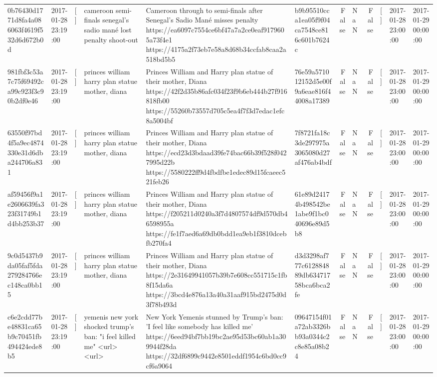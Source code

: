 \begin{tabular}{llllllrlrlll}
0b76430d1771d8fa4a086063f4619f532d6d672b0d & 2017-01-28 23:19:00 & [] & cameroon semi-finals senegal's sadio mané lost penalty shoot-out & Cameroon through to semi-finals after Senegal’s Sadio Mané misses penalty https://ea6097c7554ce6bf47a7a2ce0eaf9179605a73f4e1 https://4175a2f73eb7e58a8d68b34ccfab8caa2a518bd5b5 & b9b95510cca1ea05f9f04ca7548ce816c601b7624c & False & NaN & False & [] & 2017-01-28 23:00:00 & 2017-01-29 00:00:00 \\
981fbf3c53a7c75f69492ca99c923f3c90b2df0e46 & 2017-01-28 23:19:00 & [] & princes william harry plan statue mother, diana & Princes William and Harry plan statue of their mother, Diana https://42f2d35b86afc034f23f9b6eb444b27f916818fb00 https://55260b73557d705c5ea4f7f3d7edac1efc8a5004bf & 76e59a571012152d5e00f9a6eae816f44008a17389 & False & NaN & False & [] & 2017-01-28 23:00:00 & 2017-01-29 00:00:00 \\
63550f97bd4f5a9ec4874330e31d6dba244706a831 & 2017-01-28 23:19:00 & [] & princes william harry plan statue mother, diana & Princes William and Harry plan statue of their mother, Diana https://ecd23d3bdaad39fe74bac66b39f528f0427995d22b https://5580222ff9d4fbdfbe1edec89d15fcaeec521feb26 & 7f8721fa18c3de297975a3065080d27af476ab4bdf & False & NaN & False & [] & 2017-01-28 23:00:00 & 2017-01-29 00:00:00 \\
af59456f9a1e2606639fa323f31749b1d4bb253b37 & 2017-01-28 23:19:00 & [] & princes william harry plan statue mother, diana & Princes William and Harry plan statue of their mother, Diana https://f205211d0240a3f7d4807574df9d570db46598955a https://fe1f7aed6a69db0bdd1ea9eb1f3810dcebfb270fa4 & 61e89d24174b498542be1abe9f1bc040696e89d5b8 & False & NaN & False & [] & 2017-01-28 23:00:00 & 2017-01-29 00:00:00 \\
9c0d5437b9da05faf5fda279284766ec148ca0bb15 & 2017-01-28 23:19:00 & [] & princes william harry plan statue mother, diana & Princes William and Harry plan statue of their mother, Diana https://2e31649941057b39b7e608cc551715c1fb8f15da6a https://3bcd4e876a13a40a31aaf915bd2475d0d3f78b493d & d3d3298af777c612884889db63471758bca6bca2fe & False & NaN & False & [] & 2017-01-28 23:00:00 & 2017-01-29 00:00:00 \\
c6e2cdd77be48831ca65b9c70451fb494424ede8b5 & 2017-01-28 23:19:00 & [] & yemenis new york shocked trump's ban: "i feel killed me" <url> <url> & New York Yemenis stunned by Trump's ban: 'I feel like somebody has killed me' https://6eed94bf7bb19bc2ae95d53bc60ab1a309944f28da https://32df6899c9442e8501eddf1954c6bd0cc9cf6a9064 & 09647154f01a72ab3326bb93a0344c2c8e85a08b24 & False & NaN & False & [] & 2017-01-28 23:00:00 & 2017-01-29 00:00:00 \\

\end{tabular}
